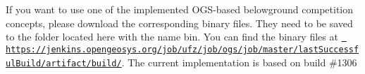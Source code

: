 If you want to use one of the implemented OGS-\/based belowground competition concepts, please download the corresponding binary files. They need to be saved to the folder located here with the name \textquotesingle{}bin\textquotesingle{}. You can find the binary files at \href{https://jenkins.opengeosys.org/job/ufz/job/ogs/job/master/lastSuccessfulBuild/artifact/build/}{\texttt{ https\+://jenkins.\+opengeosys.\+org/job/ufz/job/ogs/job/master/last\+Successful\+Build/artifact/build/}}. The current implementation is based on build \#1306 